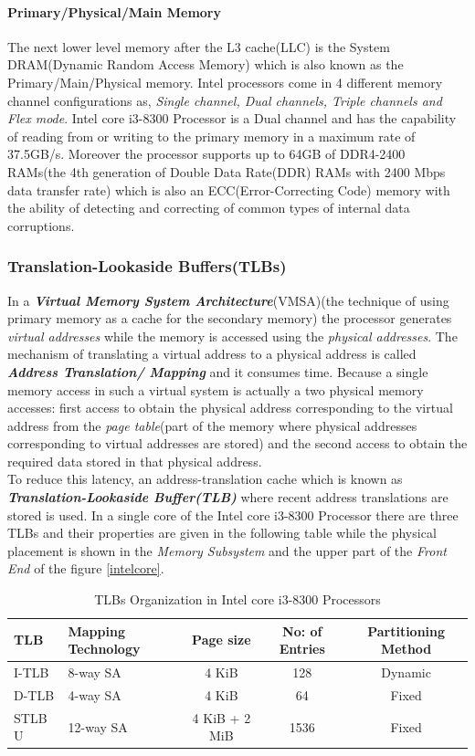 \documentclass[a4paper,11pt]{article}
\begin{document}
\paragraph{Primary/Physical/Main Memory}
The next lower level memory after the L3 cache(LLC) is the System DRAM(Dynamic Random Access Memory) which is also known as the Primary/Main/Physical memory. Intel processors come in 4 different memory channel configurations as, \textit{Single channel, Dual channels, Triple channels and Flex mode}. Intel core i3-8300 Processor is a Dual channel and has the capability of reading from or writing to the primary memory in a maximum rate of  37.5GB/s. Moreover the processor supports up to 64GB of DDR4-2400 RAMs(the 4th generation of Double Data Rate(DDR) RAMs with 2400 Mbps data transfer rate) which is also an ECC(Error-Correcting Code) memory with the ability of detecting and correcting of common types of internal data corruptions.

\subsubsection{Translation-Lookaside Buffers(TLBs)}
In a \textit{\textbf{Virtual Memory System Architecture}}(VMSA)(the technique of using primary memory as a cache for the secondary memory) the processor generates \textit{virtual addresses} while the memory is accessed using the \textit{physical addresses}. The mechanism of translating a virtual address to a physical address is called \textbf{\textit{Address Translation/ Mapping}} and it consumes time. Because a single memory access in such a virtual system is actually a two physical memory accesses: first access to obtain the physical address corresponding to the virtual address from the \textit{page table}(part of the memory where physical addresses corresponding to virtual addresses are stored) and the second access to obtain the required data stored in that physical address.\\

To reduce this latency, an address-translation cache which is known as \textbf{\textit{Translation-Lookaside Buffer(TLB)}} where recent address translations are stored is used. In a single core of the Intel core i3-8300 Processor there are three TLBs and their properties are given in the following table while the physical placement is shown in the \textit{Memory Subsystem} and the upper part of the \textit{Front End} of the figure \ref{intelcore}.


\begin{table}[!h]
	\centering
	\begin{tabular}{l |l| c| c| c}
		TLB  & Mapping Technology & Page size & No: of Entries& Partitioning Method\\
		\hline
		I-TLB & 8-way SA & 4 KiB& 128 &Dynamic\\
		D-TLB &  4-way SA & 4 KiB &64 &Fixed\\
		STLB U & 12-way SA&  4 KiB + 2 MiB & 1536 & Fixed\\
		\hline\hline
	\end{tabular}
	\caption{TLBs Organization in Intel core i3-8300 Processors}
\end{table}
\end{document}
